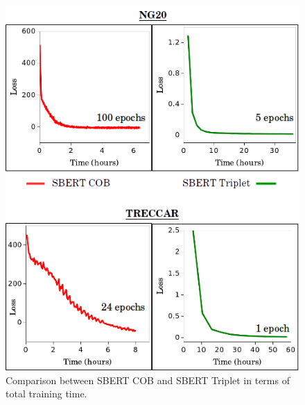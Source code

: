 \documentclass[11pt,a4paper]{article}
\begin{document}
\begin{figure}[t]
    \centering
    \includegraphics[scale=0.6]{acl-ijcnlp2021-templates/training_loss3.png}
    \caption{Comparison between SBERT COB and SBERT Triplet in terms of total training time.}
    \label{fig:train}
\end{figure}
\end{document}
